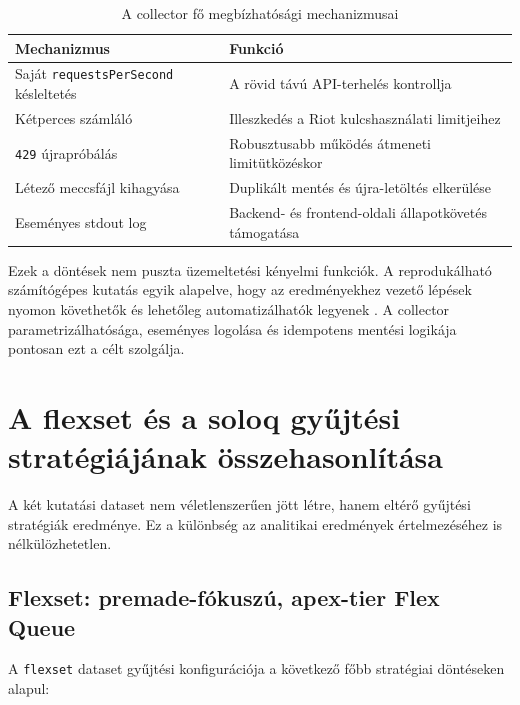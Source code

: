 ﻿\documentclass[a4paper,12pt]{report}
\begin{document}
\begin{table}[H]
\centering
\caption{A collector fő megbízhatósági mechanizmusai}
\begin{tabularx}{\textwidth}{>{\raggedright\arraybackslash}p{4.4cm}X}
\toprule
\textbf{Mechanizmus} & \textbf{Funkció} \\
\midrule
Saját \texttt{requestsPerSecond} késleltetés & A rövid távú API-terhelés kontrollja \\
Kétperces számláló & Illeszkedés a Riot kulcshasználati limitjeihez \\
\texttt{429} újrapróbálás & Robusztusabb működés átmeneti limitütközéskor \\
Létező meccsfájl kihagyása & Duplikált mentés és újra-letöltés elkerülése \\
Eseményes stdout log & Backend- és frontend-oldali állapotkövetés támogatása \\
\bottomrule
\end{tabularx}
\end{table}

Ezek a döntések nem puszta üzemeltetési kényelmi funkciók. A reprodukálható számítógépes kutatás egyik alapelve, hogy az eredményekhez vezető lépések nyomon követhetők és lehetőleg automatizálhatók legyenek \cite{sandve2013}. A collector parametrizálhatósága, eseményes logolása és idempotens mentési logikája pontosan ezt a célt szolgálja.

\section{A flexset és a soloq gyűjtési stratégiájának összehasonlítása}

A két kutatási dataset nem véletlenszerűen jött létre, hanem eltérő gyűjtési stratégiák eredménye. Ez a különbség az analitikai eredmények értelmezéséhez is nélkülözhetetlen.

\subsection{Flexset: premade-fókuszú, apex-tier Flex Queue}

A \texttt{flexset} dataset gyűjtési konfigurációja a következő főbb stratégiai döntéseken alapul:
\end{document}
